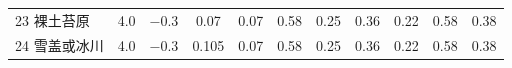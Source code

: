 \begin{landscape}
\begin{table}[htbp]
\begin{tabular}{@{}lcccccccccc@{}}
        23 裸土苔原    & 4.0        & \num { -0.3  }                                                                       & 0.07                                                                                                            & 0.07                                                                                                            & 0.58                                                                                                            & 0.25                                                                                                            & 0.36                                                                                                            & 0.22                                                                                                            & 0.58                                                                                                            & 0.38                                                                                                            \\
        24 雪盖或冰川   & 4.0        & \num { -0.3  }                                                                       & 0.105                                                                                                           & 0.07                                                                                                            & 0.58                                                                                                            & 0.25                                                                                                            & 0.36                                                                                                            & 0.22                                                                                                            & 0.58                                                                                                            & 0.38                                                                                                            \\\bottomrule
                \end{tabular}
\end{table}
\end{landscape}


